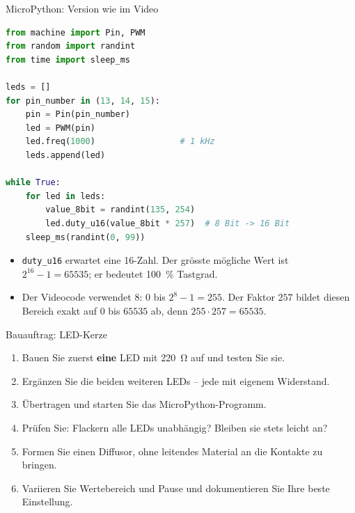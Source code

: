 \begin{frame}[fragile]{MicroPython: Version wie im Video}
\begin{lstlisting}[language=Python]
from machine import Pin, PWM
from random import randint
from time import sleep_ms

leds = []
for pin_number in (13, 14, 15):
    pin = Pin(pin_number)
    led = PWM(pin)
    led.freq(1000)                 # 1 kHz
    leds.append(led)

while True:
    for led in leds:
        value_8bit = randint(135, 254)
        led.duty_u16(value_8bit * 257)  # 8 Bit -> 16 Bit
    sleep_ms(randint(0, 99))
\end{lstlisting}
	\begin{itemize}
		\item \lstinline|duty_u16| erwartet eine \qty{16}{\bit}-Zahl. Der grösste mögliche Wert ist
		$2^{16}-1=\num{65535}$; er bedeutet \qty{100}{\percent} Tastgrad.
		\item Der Videocode verwendet \qty{8}{\bit}: $0$ bis $2^8-1=255$. Der Faktor
		$\num{257}$ bildet diesen Bereich exakt auf $0$ bis $\num{65535}$ ab, denn
		$255\cdot\num{257}=\num{65535}$.
	\end{itemize}
\end{frame}

\begin{frame}{Bauauftrag: LED-Kerze}
	\begin{enumerate}[<+->]
		\item Bauen Sie zuerst \textbf{eine} LED mit \qty{220}{\ohm} auf und testen Sie sie.
		\item Ergänzen Sie die beiden weiteren LEDs -- jede mit eigenem Widerstand.
		\item Übertragen und starten Sie das MicroPython-Programm.
		\item Prüfen Sie: Flackern alle LEDs unabhängig? Bleiben sie stets leicht an?
		\item Formen Sie einen Diffusor, ohne leitendes Material an die Kontakte zu bringen.
		\item Variieren Sie Wertebereich und Pause und dokumentieren Sie Ihre beste Einstellung.
	\end{enumerate}
\end{frame}

